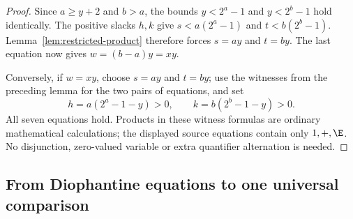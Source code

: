\documentclass[11pt]{article}
\begin{document}
\begin{proof}
Since $a\ge y+2$ and $b>a$, the bounds
$y<2^a-1$ and $y<2^b-1$ hold identically. The positive slacks $h,k$
give $s<a(2^a-1)$ and $t<b(2^b-1)$. Lemma~\ref{lem:restricted-product}
therefore forces $s=ay$ and $t=by$. The last equation now gives
$w=(b-a)y=xy$.

Conversely, if $w=xy$, choose $s=ay$ and $t=by$; use the witnesses
from the preceding lemma for the two pairs of equations, and set
\[
 h=a(2^a-1-y)>0,\qquad k=b(2^b-1-y)>0.
\]
All seven equations hold. Products in these witness formulas are
ordinary mathematical calculations; the displayed source equations
contain only $1,+,\E$. No disjunction, zero-valued variable or
extra quantifier alternation is needed.
\end{proof}

\subsection{From Diophantine equations to one universal comparison}
\end{document}

